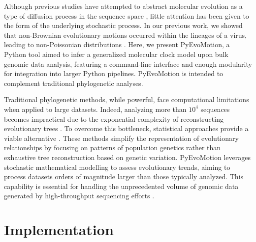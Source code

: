 Although previous studies have attempted to abstract molecular evolution as a type of diffusion process in the sequence space \cite{kimura1987, huynen1996}, little attention has been given to the form of the underlying stochastic process. In our previous work, we showed that non-Brownian evolutionary motions occurred within the lineages of a virus, leading to non-Poissonian distributions \cite{goiriz2023}. Here, we present PyEvoMotion, a Python tool aimed to infer a generalized molecular clock model upon bulk genomic data analysis, featuring a command-line interface and enough modularity for integration into larger Python pipelines. PyEvoMotion is intended to complement traditional phylogenetic analyses.

Traditional phylogenetic methods, while powerful, face computational limitations when applied to large datasets. Indeed, analyzing more than $10^4$ sequences becomes impractical due to the exponential complexity of reconstructing evolutionary trees \cite{chor2005}. To overcome this bottleneck, statistical approaches provide a viable alternative \cite{goiriz2023, obermeyer2022}. These methods simplify the representation of evolutionary relationships by focusing on patterns of population genetics rather than exhaustive tree reconstruction based on genetic variation. PyEvoMotion leverages stochastic mathematical modelling to assess evolutionary trends, aiming to process datasets orders of magnitude larger than those typically analyzed. This capability is essential for handling the unprecedented volume of genomic data generated by high-throughput sequencing efforts \cite{oude2020}.

\section{Implementation}

